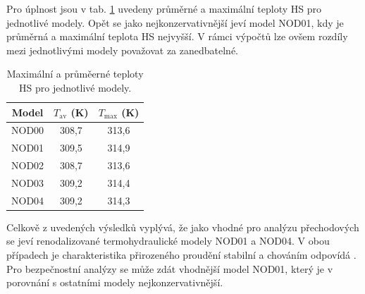 Pro úplnost jsou v tab. \ref{tab:teploty_hs} uvedeny průměrné a maximální teploty HS pro jednotlivé modely. Opět se jako nejkonzervativnější jeví model NOD01, kdy je průměrná a maximální teplota HS nejvyšší. V rámci výpočtů lze ovšem rozdíly mezi jednotlivými modely považovat za zanedbatelné.
\begin{table}[H]
	\centering
	\caption{Maximální a průměerné teploty HS pro jednotlivé modely.}
	\label{tab:teploty_hs}
	\begin{tabular}{ccc}
		\hline
		Model	&	$ T_{\text{av}} $ (K)	& $ T_{\text{max}} $ (K)	\\
		\hline
		\hline
		NOD00	&	308,7	&	 313,6	 \\
		NOD01	&	309,5	&	 314,9	 \\
		NOD02	&	308,7	&	 313,6	 \\
		NOD03	& 	309,2	&	 314,4	 \\
		NOD04	&	309,2	&	 314,3	 \\
		\hline
	\end{tabular}
\end{table} 





Celkově z uvedených výsledků vyplývá, že jako vhodné pro analýzu přechodových se jeví renodalizované termohydraulické modely NOD01 a NOD04. V obou případech je charakteristika přirozeného proudění stabilní a chováním odpovídá \cite{TRIGA_CFD}. Pro bezpečnostní analýzy se může zdát vhodnější model NOD01, který je v porovnání s ostatními modely nejkonzervativnější.







